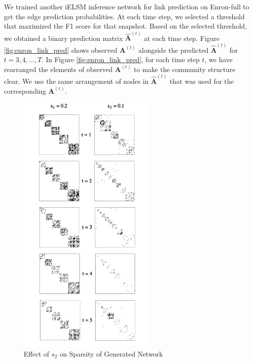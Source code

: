 \documentclass[letterpaper]{article} %
\begin{document}
We trained another iELSM inference network for link prediction on Enron-full to get the edge prediction probabilities. At each time step, we selected a threshold that maximized the F1 score for that snapshot. Based on the selected threshold, we obtained a binary prediction matrix $\hat{\mathbf{A}}^{(t)}$ at each time step. Figure \ref{fig:enron_link_pred} shows observed $\mathbf{A}^{(t)}$ alongside the predicted $\mathbf{\hat{A}}^{(t)}$ for $t = 3, 4, ..., T$. In Figure \ref{fig:enron_link_pred}, for each time step $t$, we have rearranged the elements of observed $\mathbf{A}^{(t)}$ to make the community structure clear. We use the same arrangement of nodes in $\mathbf{\hat{A}}^{(t)}$ that was used for the corresponding $\mathbf{A}^{(t)}$.

\begin{figure}
\begin{center}
\centering\includegraphics[width=0.6\textwidth]{generated_networks_sparse}
\caption{Effect of $s_2$ on Sparsity of Generated Network}
\label{fig:generatednetworksparse}
\end{center}
\end{figure}
\end{document}

